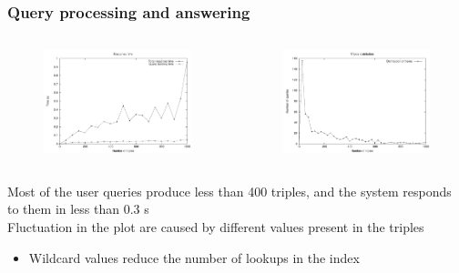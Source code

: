 \documentclass{beamer}
\begin{document}
\begin{frame}
\frametitle{Query processing and answering}
\begin{columns}[T]
\centering
\begin{figure}
\includegraphics[scale=0.46]{imgs/qr_time_tot}
\end{figure}
\centering
\begin{figure}
\includegraphics[scale=0.46]{imgs/qr_tris_tot}
\end{figure}
\end{columns}
\bigskip
Most of the user queries produce less than 400 triples, and the system
responds to them in less than 0.3 s\\
\bigskip
Fluctuation in the plot are caused by different values present in the
triples
\begin{itemize}
\item Wildcard values reduce the number of lookups in the index
\end{itemize}
\bigskip
\end{frame}
\end{document}
